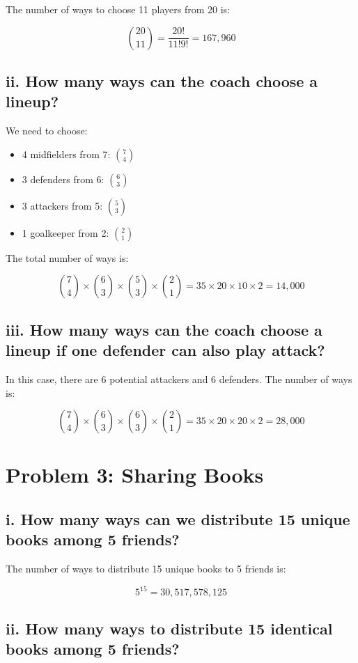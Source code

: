 \documentclass{article}
\begin{document}
The number of ways to choose 11 players from 20 is:

\[
\binom{20}{11} = \frac{20!}{11!9!} = 167,960
\]

\subsection*{ii. How many ways can the coach choose a lineup?}

We need to choose:
\begin{itemize}
    \item 4 midfielders from 7: \( \binom{7}{4} \)
    \item 3 defenders from 6: \( \binom{6}{3} \)
    \item 3 attackers from 5: \( \binom{5}{3} \)
    \item 1 goalkeeper from 2: \( \binom{2}{1} \)
\end{itemize}

\noindent The total number of ways is:

\[
\binom{7}{4} \times \binom{6}{3} \times \binom{5}{3} \times \binom{2}{1} = 35 \times 20 \times 10 \times 2 = 14,000
\]

\subsection*{iii. How many ways can the coach choose a lineup if one defender can also play attack?}

In this case, there are 6 potential attackers and 6 defenders. The number of ways is:

\[
\binom{7}{4} \times \binom{6}{3} \times \binom{6}{3} \times \binom{2}{1} = 35 \times 20 \times 20 \times 2 = 28,000
\]

\newpage

\section*{Problem 3: Sharing Books}

\subsection*{i. How many ways can we distribute 15 unique books among 5 friends?}

The number of ways to distribute 15 unique books to 5 friends is:

\[
5^{15} = 30,517,578,125
\]

\subsection*{ii. How many ways to distribute 15 identical books among 5 friends?}
\end{document}
